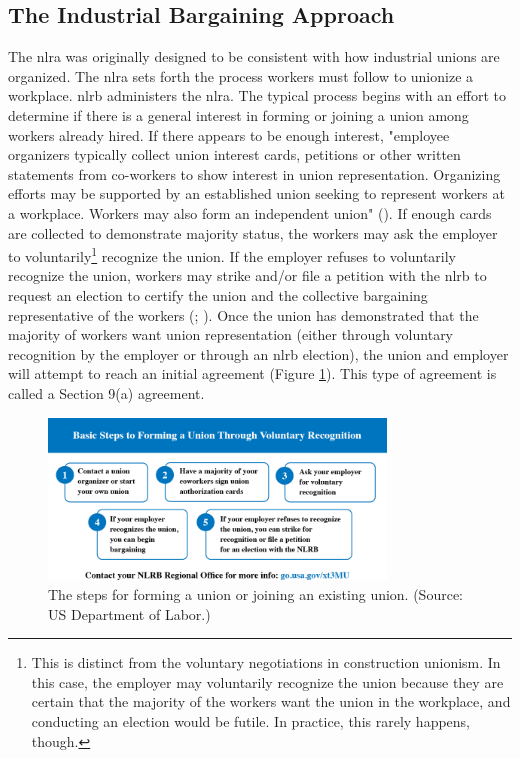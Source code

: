 \documentclass[12pt]{article}
\newcommand{\imageWidth}{0.8\textwidth}
\begin{document}
\subsection{The Industrial Bargaining Approach}

The \acrfull{nlra} was originally designed to be consistent with how industrial unions are organized. The \acrshort{nlra} sets forth the process workers must follow to unionize a workplace. \acrfull{nlrb} administers the \acrshort{nlra}. The typical process begins with an effort to determine if there is a general interest in forming or joining a union among workers already hired. If there appears to be enough interest, "employee organizers typically collect union interest cards, petitions or other written statements from co-workers to show interest in union representation. Organizing efforts may be supported by an established union seeking to represent workers at a workplace. Workers may also form an independent union" (\cite["How can I form a union?"]{dolWORKCenterUnions}). If enough cards are collected to demonstrate majority status, the workers may ask the employer to voluntarily\footnote{This is distinct from the voluntary negotiations in construction unionism. In this case, the employer may voluntarily recognize the union because they are certain that the majority of the workers want the union in the workplace, and conducting an election would be futile. In practice, this rarely happens, though.}  recognize the union. If the employer refuses to voluntarily recognize the union, workers may strike and/or file a petition with the \acrshort{nlrb} to request an election to certify the union and the collective bargaining representative of the workers (\cite["How can I form a union?"]{dolWORKCenterUnions}; \cite{nlrbNLRBProcess}). Once the union has demonstrated that the majority of workers want union representation (either through voluntary recognition by the employer or through an \acrshort{nlrb} election), the union and employer will attempt to reach an initial agreement (Figure \ref{fig:DOL}). This type of agreement is called a Section 9(a) agreement.

\begin{figure}[ht]
  \centering
  \includegraphics[width=\imageWidth]{images/DOL}
  \captionsetup{justification=centering, singlelinecheck=false, margin=2cm}
  \caption[Forming a Union]{The steps for forming a union or joining an existing union. (Source: US Department of Labor.)}
  \label{fig:DOL}
\end{figure}
\end{document}
